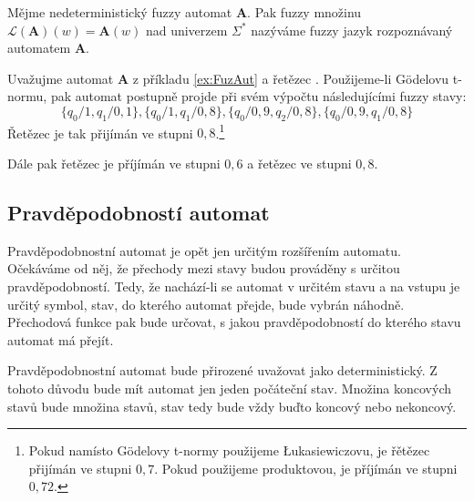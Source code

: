 \begin{definition}\label{def-JazRozpAut}
 Mějme nedeterministický fuzzy automat $\mathbf{A}$. Pak fuzzy množinu $\mathcal{L}(\mathbf{A})(w) = \mathbf{A}(w)$ nad univerzem $\Sigma^*$ nazýváme fuzzy jazyk rozpoznávaný automatem $\mathbf{A}$.
\end{definition}

\begin{example}
 Uvažujme automat $\mathbf{A}$ z příkladu \ref{ex:FuzAut} a řetězec . Použijeme-li Gödelovu t-normu, pak automat postupně projde při svém výpočtu následujícími fuzzy stavy:
 $$
  \{ q_0 / 1, 		q_1 / 0{,}1 	 		\}, 
  \{ q_0 / 1, 		q_1 / 0{,}8 	 		\}, 
  \{ q_0 / 0{,}9, 		 	q_2 / 0{,}8 	\}, 
  \{ q_0 / 0{,}9, 	q_1 / 0{,}8 		 	\}
 $$
 Řetězec je tak přijímán ve stupni $0{,}8$.\footnote{Pokud namísto Gödelovy t-normy použijeme \L{}ukasiewiczovu, je řětězec přijímán ve stupni $0{,}7$. Pokud použijeme produktovou, je příjímán ve stupni $0{,}72$.}
 
 Dále pak řetězec  je příjímán ve stupni $0{,}6$ a řetězec  ve stupni $0{,}8$.
\end{example}


\subsection{Pravděpodobností automat}

Pravděpodobnostní automat je opět jen určitým rozšířením  automatu. Očekáváme od něj, že přechody mezi stavy budou prováděny s určitou pravděpodobností. Tedy, že nachází-li se automat v určitém stavu a na vstupu je určitý symbol, stav, do kterého automat přejde, bude vybrán náhodně. Přechodová funkce pak bude určovat, s jakou pravděpodobností do kterého stavu automat má přejít.

Pravděpodobnostní automat bude přirozené uvažovat jako deterministický. Z tohoto důvodu bude mít automat jen jeden počáteční stav. Množina koncových stavů bude  množina stavů, stav tedy bude vždy buďto koncový nebo nekoncový.

